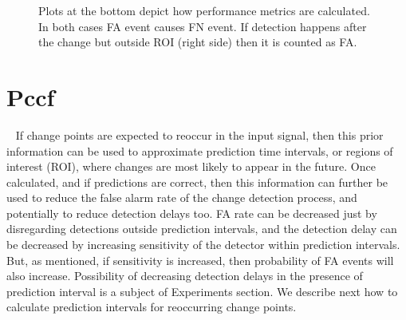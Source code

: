 \begin{figure}[!htb]
\begin{minipage}[t]{1.0\textwidth}
{    Plots at the bottom depict how performance metrics are calculated.
    In both cases FA event causes FN event.
    If detection happens after the change but outside ROI (right side) then it is counted as FA.
    }~\label{fig:possible_outcomes}
	\end{minipage}
\end{figure}



\section{Pccf}~\label{sec:pccf}
If change points are expected to reoccur in the input signal, then this prior information can be used to approximate prediction time intervals, or regions of interest (ROI), where changes are most likely to appear in the future.
Once calculated, and if predictions are correct, then this information can further be used to reduce the false alarm rate of the change detection process, %
and potentially to reduce detection delays too.
FA rate can be decreased just by disregarding detections outside prediction intervals, and the detection delay can be decreased by increasing sensitivity of the detector within prediction intervals.
But, as mentioned, if sensitivity is increased, then probability of FA events will also  increase.
Possibility of decreasing detection delays in the presence of prediction interval is a subject of Experiments section.
We describe next how to calculate prediction intervals for reoccurring change points.


